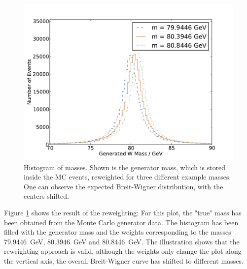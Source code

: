 \documentclass[
	paper=A4,
	parskip=full,
	chapterprefix=true,
	12pt,
	headings=normal,
	bibliography=totoc,
	listof=totoc,
	titlepage=on,
]{scrreprt}
\begin{document}
\begin{figure}
	\centering
	\includegraphics{mc_examples}
	\caption{Histogram of \PW masses. Shown is the generator \PW mass, which is stored inside the MC events, reweighted for three different example masses. One can observe the expected Breit-Wigner distribution, with the centers shifted.}
	\label{fig:mc_examples}
\end{figure}

Figure \ref{fig:mc_examples} shows the result of the reweighting: For this plot, the "true" \PW mass has been obtained from the Monte Carlo generator data. The histogram has been filled with the generator mass and the weights corresponding to the \PW masses \SI{79.9446}{\giga\electronvolt}, \SI{80.3946}{\giga\electronvolt} and \SI{80.8446}{\giga\electronvolt}. The illustration shows that the reweighting approach is valid, although the weights only change the plot along the vertical axis, the overall Breit-Wigner curve has shifted to different masses.
\end{document}
